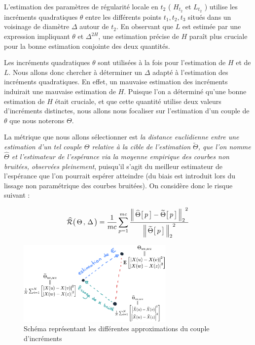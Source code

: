 L'estimation des paramètres de régularité locale en $t_2$ ( $H_{t_2}$ et $L_{t_2}$ ) utilise les incréments quadratiques $\theta$ entre les différents points $t_1, t_2, t_3$ situés dans un voisinage de diamètre $\Delta$ autour de $t_2$.
En observant que $L$ est estimée par une expression impliquant $\theta$ et $\Delta^{2 H}$, une estimation précise de $H$ paraît plus cruciale pour la bonne estimation conjointe des deux quantités.


Les incréments quadratiques $\theta$ sont utilisées à la fois pour l'estimation de $H$ et de $L$. Nous allons donc chercher à déterminer un $\Delta$ adapté à l'estimation des incréments quadratiques. En effet, un mauvaise estimation des incréments induirait une mauvaise estimation de $H$. Puisque l'on a déterminé qu'une bonne estimation de $H$ était cruciale, et que cette quantité utilise deux valeurs d'incréments distinctes, nous allons nous focaliser sur l'estimation d'un couple de $\theta$ que nous noterons $\Theta$.

\bigskip

La métrique que nous allons sélectionner est \emph{la distance euclidienne entre une estimation d'un tel couple $\Theta$ relative à la cible de l'estimation $\widetilde \Theta$, que l'on nomme $\widehat \Theta$ et l'estimateur de l'espérance via la moyenne empirique des courbes non bruitées, observées pleinement}, puisqu'il s'agit du meilleur estimateur de l'espérance que l'on pourrait espérer atteindre (du biais est introduit lors du lissage non paramétrique des courbes bruitées). On considère donc le risque suivant :


\begin{equation}
	\widehat{\mathcal R} \bigl( \, \Theta \, , \, \Delta \, \bigr)
	=
	\frac 1 {mc} \sum\limits_{p=1}^{mc} \frac{{\distnorme 2 {\widehat \Theta\bigl[\, p \,\bigr]} {\widetilde \Theta \bigl[ \,p \,\bigr]}}^2}{{\norme 2 {\widetilde \Theta \bigl[ \,p \,\bigr]}}^2}
\end{equation}

\begin{figure}[H]
	\centering
	\includegraphics[width=0.68\textwidth]{Images/sketches/theta_biais.png}
	\caption{Schéma représentant les différentes approximations du couple d'incréments}
	\label{fig:sketch_theta_biais_corpus}
\end{figure}
